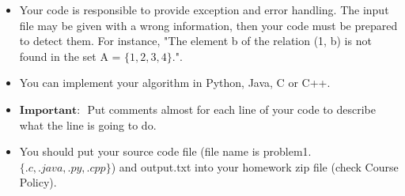 \documentclass[a4 paper]{article}
\numberwithin{equation}{section}
\newcommand{\0}{\mathbf{0}}
\begin{document}
\begin{itemize}
	\item Your code is responsible to provide exception and error handling. The input file may be given with a wrong information, then your code must be prepared to detect them. For instance, "The element b of the relation (1, b) is not found in the set A = $\{1, 2, 3, 4\}$.".
	\item You can implement your algorithm in Python, Java, C or C++.
	\item $\textbf{Important: }$ Put comments almost for each line of your code to describe what the line is going to do. 
	\item You should put your source code file (file name is problem1.$\{.c, .java, .py, .cpp\}$) and output.txt into your homework zip file (check Course Policy).
\end{itemize}
\end{document}
